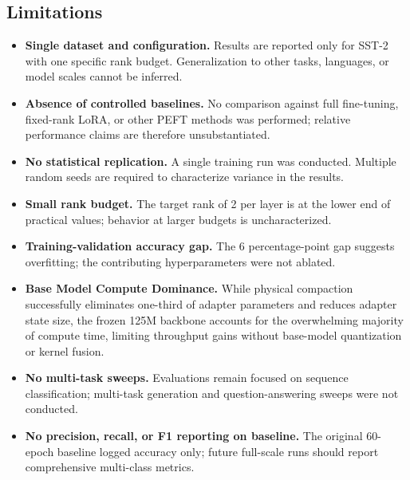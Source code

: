 \documentclass[conference]{IEEEtran}
\begin{document}
\subsection{Limitations}
\begin{itemize}
  \item \textbf{Single dataset and configuration.} Results are
    reported only for SST-2 with one specific rank budget.
    Generalization to other tasks, languages, or model scales
    cannot be inferred.
  \item \textbf{Absence of controlled baselines.} No
    comparison against full fine-tuning, fixed-rank LoRA, or
    other PEFT methods was performed; relative performance
    claims are therefore unsubstantiated.
  \item \textbf{No statistical replication.} A single training
    run was conducted. Multiple random seeds are required to
    characterize variance in the results.
  \item \textbf{Small rank budget.} The target rank of 2 per
    layer is at the lower end of practical values; behavior
    at larger budgets is uncharacterized.
  \item \textbf{Training-validation accuracy gap.} The 6
    percentage-point gap suggests overfitting; the
    contributing hyperparameters were not ablated.
  \item \textbf{Base Model Compute Dominance.} While physical
    compaction successfully eliminates one-third of adapter parameters
    and reduces adapter state size, the frozen 125M backbone accounts
    for the overwhelming majority of compute time, limiting throughput
    gains without base-model quantization or kernel fusion.
  \item \textbf{No multi-task sweeps.} Evaluations remain focused
    on sequence classification; multi-task generation and question-answering
    sweeps were not conducted.
  \item \textbf{No precision, recall, or F1 reporting on baseline.} The
    original 60-epoch baseline logged accuracy only; future full-scale runs
    should report comprehensive multi-class metrics.
\end{itemize}
\end{document}
